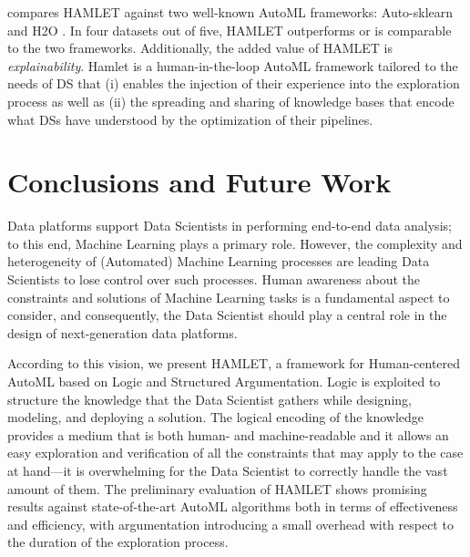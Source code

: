 \documentclass[5p,times]{elsarticle}
\newcommand{\mf}[1]{#1}
\begin{document}
\mf{
 compares HAMLET against two well-known AutoML frameworks: Auto-sklearn \cite{feurer2019auto} and H2O \cite{ledell2020h2o}.
In four datasets out of five, HAMLET outperforms or is comparable to the two frameworks.
Additionally, the added value of HAMLET is \textit{explainability}. 
Hamlet is a human-in-the-loop AutoML framework tailored to the needs of DS that (i) enables the injection of their experience into the exploration process as well as (ii) the spreading and sharing of knowledge bases that encode what DSs have understood by the optimization of their pipelines.
}

\section{Conclusions and Future Work}\label{sec:conclusion}

Data platforms support Data Scientists in performing end-to-end data analysis; to this end, Machine Learning plays a primary role.
However, the complexity and heterogeneity of (Automated) Machine Learning processes are leading Data Scientists to lose control over such processes.
Human awareness about the constraints and solutions of Machine Learning tasks is a fundamental aspect to consider, and consequently, the Data Scientist should play a central role in the design of next-generation data platforms.

According to this vision, we present HAMLET, a framework for Human-centered AutoML based on Logic and Structured Argumentation.
Logic is exploited to structure the knowledge that the Data Scientist gathers while designing, modeling, and deploying a solution.
The logical encoding of the knowledge provides a medium that is both human- and machine-readable and it allows an easy exploration and verification of all the constraints that may apply to the case at hand---it is overwhelming for the Data Scientist to correctly handle the vast amount of them.
The preliminary evaluation of HAMLET shows promising results against state-of-the-art AutoML \mf{algorithms} both in terms of effectiveness and efficiency\mf{, with argumentation introducing a small overhead with respect to the duration of the exploration process}.
\vspace{1cm}
\end{document}
